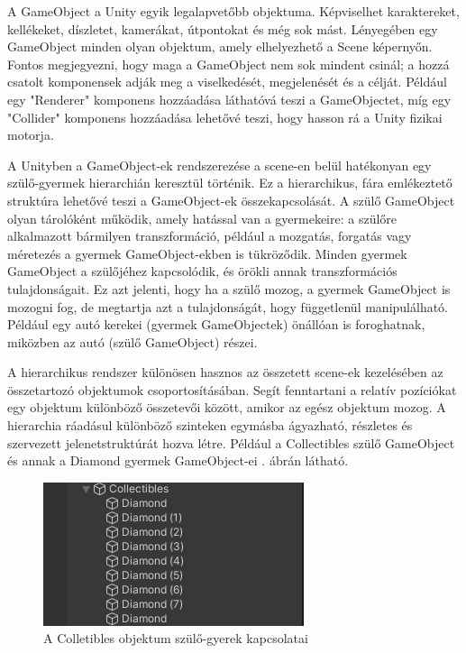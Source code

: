 A GameObject a Unity egyik legalapvetőbb objektuma. Képviselhet karaktereket, kellékeket, díszletet, kamerákat, útpontokat és még sok mást. Lényegében egy GameObject minden olyan objektum, amely elhelyezhető a Scene képernyőn. Fontos megjegyezni, hogy maga a GameObject nem sok mindent csinál; a hozzá csatolt komponensek adják meg a viselkedését, megjelenését és a célját. Például egy "Renderer" komponens hozzáadása láthatóvá teszi a GameObjectet, míg egy "Collider" komponens hozzáadása lehetővé teszi, hogy hasson rá a Unity fizikai motorja.\cite{unitygameobject}

A Unityben a GameObject-ek rendszerezése a scene-en belül hatékonyan egy szülő-gyermek hierarchián keresztül történik. Ez a hierarchikus, fára emlékeztető struktúra lehetővé teszi a GameObject-ek összekapcsolását. A szülő GameObject olyan tárolóként működik, amely hatással van a gyermekeire: a szülőre alkalmazott bármilyen transzformáció, például a mozgatás, forgatás vagy méretezés a gyermek GameObject-ekben is tükröződik. Minden gyermek GameObject a szülőjéhez kapcsolódik, és örökli annak transzformációs tulajdonságait. Ez azt jelenti, hogy ha a szülő mozog, a gyermek GameObject is mozogni fog, de megtartja azt a tulajdonságát, hogy függetlenül manipulálható. Például egy autó kerekei (gyermek GameObjectek) önállóan is foroghatnak, miközben az autó (szülő GameObject) részei.\cite{unityhierarchy}

A hierarchikus rendszer különösen hasznos az összetett scene-ek kezelésében az összetartozó objektumok csoportosításában. Segít fenntartani a relatív pozíciókat egy objektum különböző összetevői között, amikor az egész objektum mozog. A hierarchia ráadásul különböző szinteken egymásba ágyazható, részletes és szervezett jelenetstruktúrát hozva létre.\cite{unityhierarchy} Például a Collectibles szülő GameObject és annak a Diamond gyermek GameObject-ei . ábrán látható.

\begin{figure}[ht]
\centering
\includegraphics[scale = 0.6]{images/hierarchia.png}
\caption{A Colletibles objektum szülő-gyerek kapcsolatai}
\label{fig:hierarchydiamond}
\end{figure}


